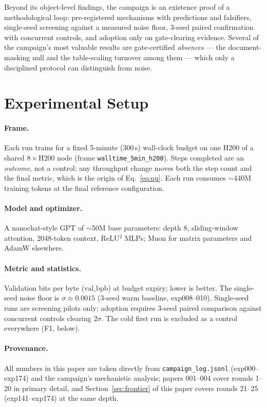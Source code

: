 \documentclass{article}
\newcommand{\valbpb}{\mathrm{val\_bpb}}
\begin{document}
Beyond its object-level findings, the campaign is an existence proof of a methodological loop: pre-registered mechanisms with predictions and falsifiers, single-seed screening against a measured noise floor, 3-seed paired confirmation with concurrent controls, and adoption only on gate-clearing evidence. Several of the campaign's most valuable results are gate-certified \emph{absences} --- the document-masking null and the table-scaling turnover among them --- which only a disciplined protocol can distinguish from noise.

\section{Experimental Setup}
\label{sec:setup}

\paragraph{Frame.} Each run trains for a fixed 5-minute (300\,s) wall-clock budget on one H200 of a shared $8\times$H200 node (frame \texttt{walltime\_5min\_h200}). Steps completed are an \emph{outcome}, not a control: any throughput change moves both the step count and the final metric, which is the origin of Eq.~\ref{eq:qu}. Each run consumes $\sim$440M training tokens at the final reference configuration.

\paragraph{Model and optimizer.} A nanochat-style GPT \cite{karpathy2025nanochat} of $\sim$50M base parameters: depth 8, sliding-window attention, 2048-token context, ReLU$^2$ MLPs; Muon \cite{jordan2024muon} for matrix parameters and AdamW elsewhere.

\paragraph{Metric and statistics.} Validation bits per byte ($\valbpb$) at budget expiry; lower is better. The single-seed noise floor is $\sigma \approx 0.0015$ (3-seed warm baseline, exp008--010). Single-seed runs are screening pilots only; adoption requires 3-seed paired comparison against concurrent controls clearing $2\sigma$. The cold first run is excluded as a control everywhere (F1, below).

\paragraph{Provenance.} All numbers in this paper are taken directly from \texttt{campaign\_log.jsonl} (exp000--exp174) and the campaign's mechanistic analysis; papers 001--004 cover rounds 1--20 in primary detail, and Section~\ref{sec:frontier} of this paper covers rounds 21--25 (exp141--exp174) at the same depth.
\end{document}

